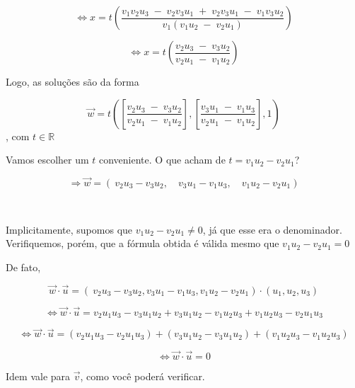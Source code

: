 \[
\Longleftrightarrow x = t \left( \frac{v_1v_2u_3 \; - \; v_2v_3u_1 \; + \; v_2v_3u_1 \; - \; v_1v_3u_2}{v_1(v_1u_2 \; - \; v_2u_1)} \right)
\]

\[
\Longleftrightarrow x = t \left( \frac{v_2u_3 \; - \; v_3u_2}{v_2u_1 \; - \; v_1u_2} \right)
\]




Logo, as soluções são da forma

\[
\vec{w} = t \left( \left[ \frac{v_2u_3 \; - \; v_3u_2}{v_2u_1 \; - \; v_1u_2} \right], \left[ \frac{v_3u_1 \; - \; v_1u_3}{v_2u_1 \; - \; v_1u_2} \right], 1 \right) 
\], com \(t \in \mathbb{R}\)




Vamos escolher um \(t\) conveniente. O que acham de \(t = v_1u_2 - v_2u_1\)?

\[
\Longrightarrow \vec{w} = \left(\ v_2u_3 - v_3u_2,\quad v_3u_1 - v_1u_3,\quad v_1u_2 - v_2u_1\right)
\]

 

Implicitamente, supomos que \(v_1u_2 - v_2u_1 \neq 0\), já que esse era o denominador. Verifiquemos, porém, que a fórmula obtida é válida mesmo que \(v_1u_2 - v_2u_1 = 0\)

De fato,

\[
\vec{w} \cdot \vec{u} = (\ v_2u_3 - v_3u_2, v_3u_1 - v_1u_3, v_1u_2 - v_2u_1) \cdot (u_1, u_2, u_3)
\]

\[
\Longleftrightarrow \vec{w} \cdot \vec{u} = v_2u_1u_3 - v_3u_1u_2 + v_3u_1u_2 - v_1u_2u_3 + v_1u_2u_3 - v_2u_1u_3 
\]

\[
\Longleftrightarrow \vec{w} \cdot \vec{u} = (v_2u_1u_3 - v_2u_1u_3) + (v_3u_1u_2 - v_3u_1u_2) + (v_1u_2u_3 - v_1u_2u_3) 
\]

\[
\Longleftrightarrow \vec{w} \cdot \vec{u} = 0
\]

Idem vale para \(\vec{v}\), como você poderá verificar.
